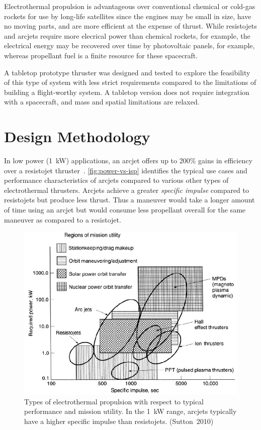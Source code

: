 \documentclass[journal]{IEEEtran}
\begin{document}
Electrothermal propulsion is advantageous over conventional chemical or cold-gas rockets for use by long-life satellites since the engines may be small in size, have no moving parts, and are more efficient at the expense of thrust.
While resistojets and arcjets require more elecrical power than chemical rockets, for example, the electrical energy may be recovered over time by photovoltaic panels, for example, whereas propellant fuel is a finite resource for these spacecraft.

A tabletop prototype thruster was designed and tested to explore the feasibility of this type of system with less strict requirements compared to the limitations of building a flight-worthy system.
A tabletop version does not require integration with a spacecraft, and mass and spatial limitations are relaxed.

\section{Design Methodology}
\label{sec:method}
In low power (\SI{1}{\kilo\watt}) applications, an arcjet offers up to 200\% gains in efficiency over a resistojet thruster~\cite{sutton}.
\autoref{fig:power-vs-isp} identifies the typical use cases and performance characteristics of arcjets compared to various other types of electrothermal thrusters.
Arcjets achieve a greater \emph{specific impulse} compared to resistojets but produce less thrust.
Thus a maneuver would take a longer amount of time using an arcjet but would consume less propellant overall for the same maneuver as compared to a resistojet.
\begin{figure}[hbp]
  \centering
  \includegraphics[width=\linewidth]{img/power-vs-isp_sutton}
  \caption[Types of electrothermal propulsion]{Types of electrothermal propulsion with respect to typical performance and mission utility.
  In the \SI{1}{\kilo\watt} range, arcjets typically have a higher specific impulse than resistojets. (Sutton~2010)
\label{fig:power-vs-isp}}
\end{figure}
\end{document}
